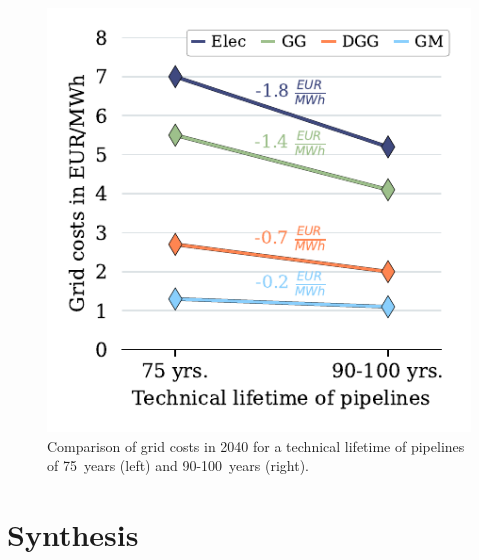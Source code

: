 \begin{figure}[h]
	\centering
	\includegraphics[width=0.6\linewidth]{figures/results/grid_charges_development/cleaned_grid_charges.pdf}
	\caption{Comparison of grid costs in 2040 for a technical lifetime of pipelines of \SI{75}{years} (left) and 90-\SI{100}{years} (right).}
	\label{fig_grid_charges_no_capex}
\end{figure}

\section{Synthesis}\label{synthesis}



